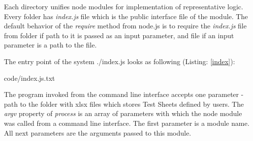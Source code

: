 Each directory unifies node modules for implementation of representative logic. Every folder has \textit{index.js} file which is the public interface file of the module. The default behavior of the \textit{require} method from node.js is to require the \textit{index.js} file from folder if path to it is passed as an input parameter, and file if an input parameter is a path to the file.

The entry point of the system ./index.js looks as following (Listing: \ref{index}):


{code/index.js.txt}

The program invoked from the command line interface accepts one parameter - path to the folder with xlsx files which stores Test Sheets defined by users. The \textit{argv} property of \textit{process} is an array of parameters with which the node module was called from a command line interface. The first parameter is a module name. All next parameters are the arguments passed to this module.



